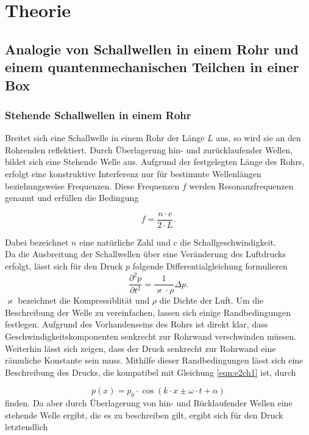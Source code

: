 \section{Theorie}
\label{sec:Theorie}


\subsection{Analogie von Schallwellen in einem Rohr und einem quantenmechanischen Teilchen in einer Box}
\label{subsec:tch1}

\subsubsection{Stehende Schallwellen in einem Rohr}
\label{subsubsec:tch11}
Breitet sich eine Schallwelle in einem Rohr der Länge $L$ aus, so wird sie an den Rohrenden reflektiert.
Durch Überlagerung hin- und zurücklaufender Wellen, bildet sich eine Stehende Welle aus.
Aufgrund der festgelegten Länge des Rohrs, erfolgt eine konstruktive Interferenz nur für bestimmte Wellenlängen
beziehungsweise Frequenzen. Diese Frequenzen $f$ werden Resonanzfrequenzen genannt und erfüllen die Bedingung


\begin{equation}
  \label{eqn:e1ch1}
  f = \frac{n \cdot c}{2 \cdot L}.
\end{equation}


Dabei bezeichnet $n$ eine natürliche Zahl und $c$ die Schallgeschwindigkeit.\\
Da die Ausbreitung der Schallwellen über eine Veränderung des Luftdrucks erfolgt, lässt sich für den
Druck $p$ folgende Differentialgleichung formulieren
\begin{equation}
  \label{eqn:e2ch1}
  \frac{\partial ^2 p}{\partial  t^2} = \frac{1}{\varkappa \cdot \rho} \Delta  p.
\end{equation}
$\varkappa$ bezeichnet die Kompressiblität und $\rho$ die Dichte der Luft.
Um die Beschreibung der Welle zu vereinfachen, lassen sich einige Randbedingungen
festlegen. Aufgrund des Vorhandenseins des Rohrs ist direkt klar, dass Geschwindigkeitskomponenten
senkrecht zur Rohrwand verschwinden müssen. Weiterhin lässt sich zeigen, dass der Druck senkrecht zur Rohrwand eine räumliche Konstante sein muss.
Mithilfe dieser Randbedingungen lässt sich eine Beschreibung des Drucks,
die kompatibel mit Gleichung \eqref{eqn:e2ch1} ist, durch


\begin{equation}
  \label{eqn:e3ch1}
  p(x) = p_{0} \cdot \cos\left( k\cdot x \pm \omega \cdot t + \alpha \right)
\end{equation}
finden. Da aber durch Überlagerung von hin- und Rücklaufender Wellen eine stehende Welle ergibt, die es
zu beschreiben gilt, ergibt sich für den Druck letztendlich

